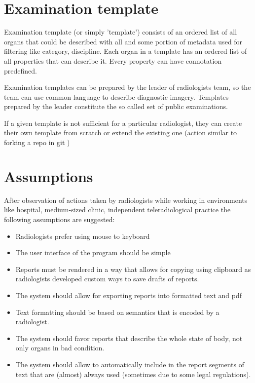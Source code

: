 \documentclass[12pt, twoside, openany]{report}
\theoremstyle{definition}
\begin{document}
\section{Examination template}
Examination template (or simply 'template') consists of an ordered list of all organs that could be described with all and some portion of metadata used for filtering like category, discipline. Each organ in a template has an ordered list of all properties that can describe it. Every property can have connotation predefined. 

Examination templates can be prepared by the leader of radiologists team, so the team can use common language to describe diagnostic imagery. Templates prepared by the leader constitute the so called set of public examinations.

If a given template is not sufficient for a particular radiologist, they can  create their own template from scratch or extend the existing one (action similar to forking a repo in git \cite{forking})


\section{Assumptions}
After observation of actions taken by radiologists while working in environments like hospital, medium-sized clinic, independent teleradiological practice the following assumptions are suggested:
\begin{itemize}
    \item Radiologists prefer using mouse to keyboard
    \item The user interface of the program should be simple 
    \item Reports must be rendered in a way that allows for copying using clipboard as radiologists developed custom ways to save drafts of reports.
    \item The system should allow for exporting reports into formatted text and pdf
    \item Text formatting should be based on semantics that is encoded by a radiologist.
    \item The system should favor reports that describe the whole state of body, not only organs in bad condition.
    \item The system should allow to automatically include in the report segments of text that are (almost) always used (sometimes due to some legal regulations).

\end{itemize}
\end{document}
